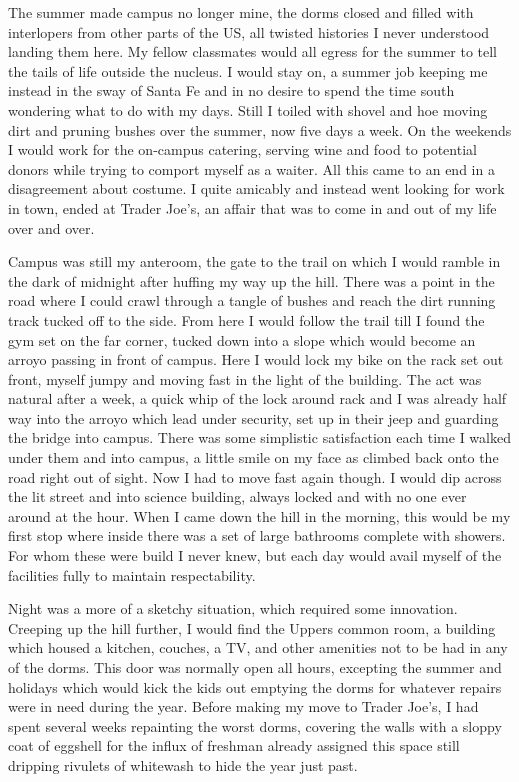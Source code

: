 \documentclass[ebook, 10pt, openright, onecolumn]{memoir}
\newcommand*\td[1]{
  \todo[inline]{
     #1 
  }
}
\newcommand*\finish{\td{ ----- Finish this section -----}}
\begin{document}
The summer made campus no longer mine, the dorms closed and filled with
interlopers from other parts of the US, all twisted histories I never understood
landing them here.  My fellow classmates would all egress for the summer to tell
the tails of life outside the nucleus.  I would stay on, a summer job
keeping me instead in the sway of Santa Fe and in no desire to spend the time
south wondering what to do with my days.  Still I toiled with shovel and hoe
moving dirt and pruning bushes over the summer, now five days a week.  On the
weekends I would work for the on-campus catering, serving wine and food to
potential donors while trying to comport myself as a waiter.  All this came to
an end in a disagreement about costume.  I quite amicably and instead went
looking for work in town, ended at Trader Joe's, an affair that was to come in
and out of my life over and over.

\finish


Campus was still my anteroom, the gate to the trail on which I would ramble in
the dark of midnight after huffing my way up the hill.  There was a point in the
road where I could crawl through a tangle of bushes and reach the dirt running
track tucked off to the side.  From here I would follow the trail till I found
the gym set on the far corner, tucked down into a slope which would become an
arroyo passing in front of campus.  Here I would lock my bike on the rack set
out front, myself jumpy and moving fast in the light of the building.  The act
was natural after a week, a quick whip of the lock around rack and I was already
half way into the arroyo which lead under security, set up in their jeep and
guarding the bridge into campus.  There was some simplistic satisfaction each
time I walked under them and into campus, a little smile on my face as climbed
back onto the road right out of sight.  Now I had to move fast again though.  I
would dip across the lit street and into science building, always locked and
with no one ever around at the hour.  When I came down the hill in the morning,
this would be my first stop where inside there was a set of large bathrooms
complete with showers.  For whom these were build I never knew, but each day
would avail myself of the facilities fully to maintain respectability.

Night was a more of a sketchy situation, which required some innovation.
Creeping up the hill further, I would find the Uppers common room, a building
which housed a kitchen, couches, a TV, and other amenities not to be had in any
of the dorms.  This door was normally open all hours, excepting the summer and
holidays which would kick the kids out emptying the dorms for whatever repairs
were in need during the year.  Before making my move to Trader Joe's, I had
spent several weeks repainting the worst dorms, covering the walls with a sloppy
coat of eggshell for the influx of freshman already assigned this space still
dripping rivulets of whitewash to hide the year just past.
\end{document}
